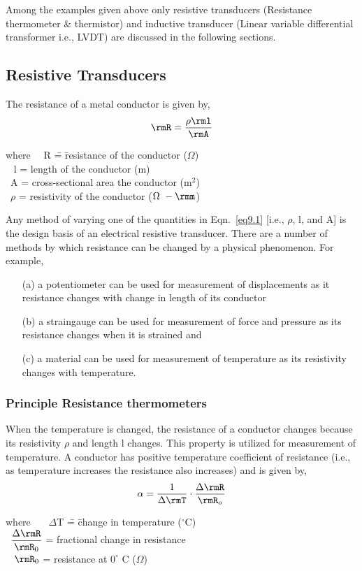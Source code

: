 Among the examples given above only resistive transducers (Resistance
thermometer \& thermistor) and inductive transducer (Linear variable
differential transformer i.e., LVDT) are discussed in the following sections.

\subsection{Resistive Transducers}\label{sec9.6.1}

The resistance of a metal conductor is given by, 
\begin{equation}
\rmR = \dfrac{\rho\rml}{\rmA} \label{eq9.1}
\end{equation}
\begin{tabbing}
where ~~R \= = \= resistance of the conductor  ($\Omega$)\\[3pt]
\quad\qquad~ l \> = \> length of the conductor (m)\\[3pt]
\quad\qquad~A \> = \> cross-sectional area the conductor (m$^2$)\\[3pt]
\quad\qquad~$\rho$ \> = \> resistivity of the conductor ($\Omega~ -\rmm$)
\end{tabbing}

Any method of varying one of the quantities in Eqn.~\eqref{eq9.1}
[i.e., $\rho$, l, and A] is the design basis of an electrical resistive
transducer. There are a number of methods by which resistance can be
changed by a physical phenomenon. For example,
\begin{itemize}
\item[(a)] a potentiometer can be used for measurement of
displacements as it resistance changes with change in length of its
conductor 
\item[(b)] a straingauge can be used for measurement of force and
pressure as its resistance changes when it is strained and 
\item[(c)] a material can be used for measurement of temperature as
its resistivity changes with temperature.
\end{itemize}

\subsubsection{Principle Resistance thermometers}\label{sec9.6.1.1}
When the temperature is changed, the resistance of a conductor changes
because its resistivity $\rho$ and length l changes. This property is
utilized for measurement of temperature. A conductor has positive
temperature coefficient of resistance (i.e., as temperature increases
the resistance also increases) and is given by, 
\begin{equation}
\alpha = \frac{1}{\Delta \rmT} \cdot \frac{\Delta \rmR}{\rmR_o}\label{eq9.2}
\end{equation}
\begin{tabbing}
where ~~~$\Delta$T \= = \= change in temperature ($^\circ$C) \\[3pt]
\qquad \quad~$\dfrac{\Delta \rmR}{\rmR_0}$ \> = \> fractional change in resistance \\[3pt]
\qquad \quad~ $\rmR_0$ \> = \> resistance at $0^\circ$ C ($\Omega$)
\end{tabbing}

